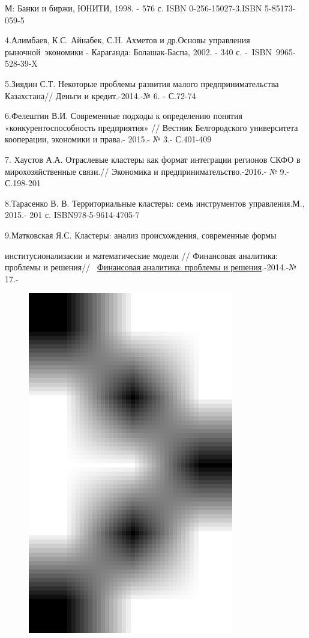 М: Банки и биржи, ЮНИТИ, 1998. - 576 с. ISBN 0-256-15027-3.ISBN
5-85173-059-5

4.Алимбаев, К.С. Айнабек, С.Н. Ахметов и др.Основы управления
рыночной~экономики - Караганда: Болашак-Баспа, 2002. - 340 с.
-~ISBN~9965-528-39-X

5.Зиядин С.Т. Некоторые проблемы развития малого предпринимательства
Казахстана// Деньги и кредит.-2014.-№ 6. - С.72-74

6.Фелештин В.И. Современные подходы к определению понятия
«конкурентоспособность предприятия» // Вестник Белгородского
университета кооперации, экономики и права.- 2015.- № 3.- С.401-409

7. Хаустов А.А. Отраслевые кластеры как формат интеграции регионов СКФО
в мирохозяйственные связи.// Экономика и предпринимательство.-2016.- №
9.- С.198-201

8.Тарасенко В. В. Территориальные кластеры: семь инструментов
управления.М.,\\
2015.- 201 с. ISBN978-5-9614-4705-7

9.Матковская Я.С. Кластеры: анализ происхождения, современные формы

институсионализасии и математические модели // Финансовая аналитика:
проблемы и решения//
~\href{https://www.fin-izdat.ru/journal/fa/}{Финансовая аналитика:
проблемы и решения}.-2014.-№ 17.-
\begin{figure}[H]
	\centering
	\includegraphics[width=0.8\textwidth]{media/ekon/image1}
	\caption*{}
\end{figure}


